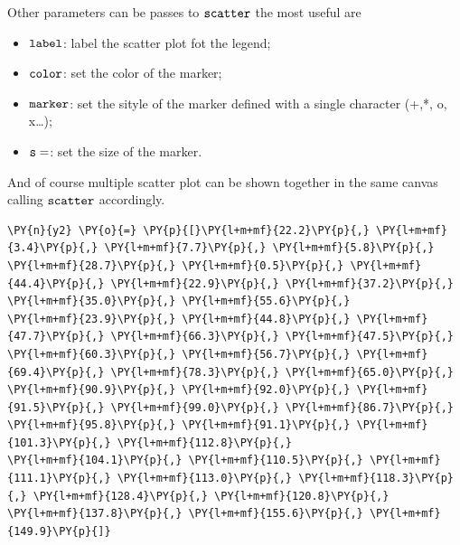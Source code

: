 Other parameters can be passes to \(\tt{scatter}\) the most useful are

\begin{itemize}
	\tightlist
	\item
	\(\tt{label}\): label the scatter plot fot the legend;
	\item
	\(\tt{color}\): set the color of the marker;
	\item
	\(\tt{marker}\): set the sityle of the marker defined with a single
	character (+,*, o, x\ldots{});
	\item
	\(\tt{s=}\): set the size of the marker.
\end{itemize}

And of course multiple scatter plot can be shown together in the same
canvas calling \(\tt{scatter}\) accordingly.

\begin{tcolorbox}[breakable, size=fbox, boxrule=1pt, pad at break*=1mm,colback=cellbackground, colframe=cellborder]
\begin{Verbatim}[commandchars=\\\{\}]
\PY{n}{y2} \PY{o}{=} \PY{p}{[}\PY{l+m+mf}{22.2}\PY{p}{,} \PY{l+m+mf}{3.4}\PY{p}{,} \PY{l+m+mf}{7.7}\PY{p}{,} \PY{l+m+mf}{5.8}\PY{p}{,} \PY{l+m+mf}{28.7}\PY{p}{,} \PY{l+m+mf}{0.5}\PY{p}{,} \PY{l+m+mf}{44.4}\PY{p}{,} \PY{l+m+mf}{22.9}\PY{p}{,} \PY{l+m+mf}{37.2}\PY{p}{,} \PY{l+m+mf}{35.0}\PY{p}{,} \PY{l+m+mf}{55.6}\PY{p}{,} 
\PY{l+m+mf}{23.9}\PY{p}{,} \PY{l+m+mf}{44.8}\PY{p}{,} \PY{l+m+mf}{47.7}\PY{p}{,} \PY{l+m+mf}{66.3}\PY{p}{,} \PY{l+m+mf}{47.5}\PY{p}{,} \PY{l+m+mf}{60.3}\PY{p}{,} \PY{l+m+mf}{56.7}\PY{p}{,} \PY{l+m+mf}{69.4}\PY{p}{,} \PY{l+m+mf}{78.3}\PY{p}{,} \PY{l+m+mf}{65.0}\PY{p}{,} 
\PY{l+m+mf}{90.9}\PY{p}{,} \PY{l+m+mf}{92.0}\PY{p}{,} \PY{l+m+mf}{91.5}\PY{p}{,} \PY{l+m+mf}{99.0}\PY{p}{,} \PY{l+m+mf}{86.7}\PY{p}{,} \PY{l+m+mf}{95.8}\PY{p}{,} \PY{l+m+mf}{91.1}\PY{p}{,} \PY{l+m+mf}{101.3}\PY{p}{,} \PY{l+m+mf}{112.8}\PY{p}{,} 
\PY{l+m+mf}{104.1}\PY{p}{,} \PY{l+m+mf}{110.5}\PY{p}{,} \PY{l+m+mf}{111.1}\PY{p}{,} \PY{l+m+mf}{113.0}\PY{p}{,} \PY{l+m+mf}{118.3}\PY{p}{,} \PY{l+m+mf}{128.4}\PY{p}{,} \PY{l+m+mf}{120.8}\PY{p}{,} \PY{l+m+mf}{137.8}\PY{p}{,} \PY{l+m+mf}{155.6}\PY{p}{,} \PY{l+m+mf}{149.9}\PY{p}{]}
	

\end{Verbatim}
\end{tcolorbox}
